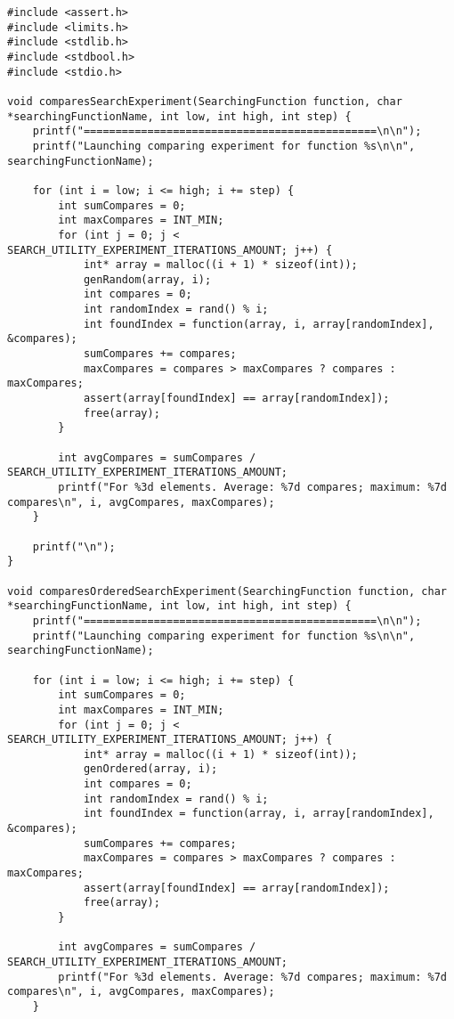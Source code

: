\documentclass[a4paper,14pt]{extarticle}
\begin{document}
\begin{enumerate}
\begin{verbatim}
#include <assert.h>
#include <limits.h>
#include <stdlib.h>
#include <stdbool.h>
#include <stdio.h>

void comparesSearchExperiment(SearchingFunction function, char *searchingFunctionName, int low, int high, int step) {
    printf("==============================================\n\n");
    printf("Launching comparing experiment for function %s\n\n", searchingFunctionName);

    for (int i = low; i <= high; i += step) {
        int sumCompares = 0;
        int maxCompares = INT_MIN;
        for (int j = 0; j < SEARCH_UTILITY_EXPERIMENT_ITERATIONS_AMOUNT; j++) {
            int* array = malloc((i + 1) * sizeof(int));
            genRandom(array, i);
            int compares = 0;
            int randomIndex = rand() % i;
            int foundIndex = function(array, i, array[randomIndex], &compares);
            sumCompares += compares;
            maxCompares = compares > maxCompares ? compares : maxCompares;
            assert(array[foundIndex] == array[randomIndex]);
            free(array);
        }

        int avgCompares = sumCompares / SEARCH_UTILITY_EXPERIMENT_ITERATIONS_AMOUNT;
        printf("For %3d elements. Average: %7d compares; maximum: %7d compares\n", i, avgCompares, maxCompares);
    }

    printf("\n");
}

void comparesOrderedSearchExperiment(SearchingFunction function, char *searchingFunctionName, int low, int high, int step) {
    printf("==============================================\n\n");
    printf("Launching comparing experiment for function %s\n\n", searchingFunctionName);

    for (int i = low; i <= high; i += step) {
        int sumCompares = 0;
        int maxCompares = INT_MIN;
        for (int j = 0; j < SEARCH_UTILITY_EXPERIMENT_ITERATIONS_AMOUNT; j++) {
            int* array = malloc((i + 1) * sizeof(int));
            genOrdered(array, i);
            int compares = 0;
            int randomIndex = rand() % i;
            int foundIndex = function(array, i, array[randomIndex], &compares);
            sumCompares += compares;
            maxCompares = compares > maxCompares ? compares : maxCompares;
            assert(array[foundIndex] == array[randomIndex]);
            free(array);
        }

        int avgCompares = sumCompares / SEARCH_UTILITY_EXPERIMENT_ITERATIONS_AMOUNT;
        printf("For %3d elements. Average: %7d compares; maximum: %7d compares\n", i, avgCompares, maxCompares);
    }


\end{verbatim}
\end{enumerate}
\end{document}
